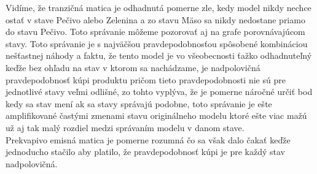 \documentclass[a4paper]{article}
\begin{document}
Vidíme, že tranzičná matica je odhadnutá pomerne zle, kedy model nikdy nechce ostať v stave Pečivo alebo Zelenina a zo stavu Mäso sa nikdy nedostane priamo do stavu Pečivo. Toto správanie môžeme pozorovať aj na grafe porovnávajúcom stavy. Toto správanie je s najväčšou pravdepodobnosťou spôsobené kombináciou nešťastnej náhody a faktu, že tento model je vo všeobecnosti ťažko odhadnuteľný keďže bez ohľadu na stav v ktorom sa nachádzame, je nadpolovičná pravdepodobnosť kúpi produktu pričom tieto pravdepodobnosti nie sú pre jednotlivé stavy veľmi odlišné, zo tohto vyplýva, že je pomerne náročné určiť bod kedy sa stav mení ak sa stavy správajú podobne, toto správanie je ešte amplifikované častými zmenami stavu originálneho modelu ktoré ešte viac mažú už aj tak malý rozdiel medzi správaním modelu v danom stave.
\\

Prekvapivo emisná matica je pomerne rozumná čo sa však dalo čakať keďže jednoducho stačilo aby platilo, že pravdepodobnosť kúpi je pre každý stav nadpolovičná.
\end{document}
